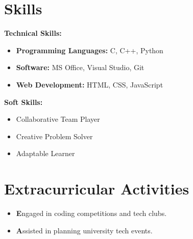 \documentclass[a4paper,10pt]{article}
\begin{document}
\section*{Skills}

\textbf{Technical Skills:}
\begin{itemize}[left=0pt]
    \item \textbf{Programming Languages:} C, C++, Python
    \item \textbf{Software:} MS Office, Visual Studio, Git
    \item \textbf{Web Development:} HTML, CSS, JavaScript
\end{itemize}

\textbf{Soft Skills:}
\begin{itemize}[left=0pt]
    \item Collaborative Team Player
    \item Creative Problem Solver
    \item Adaptable Learner
\end{itemize}

\section*{Extracurricular Activities}
\begin{itemize}[left=0pt]
    \item \textbf Engaged in coding competitions and tech clubs.
    \item \textbf Assisted in planning university tech events.
\end{itemize}
\end{document}
